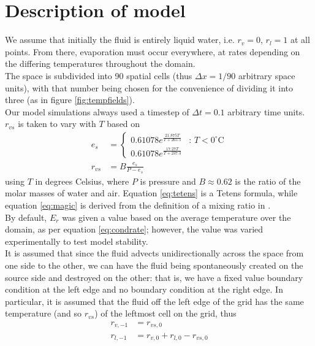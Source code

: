 \documentclass[11pt]{article}
\begin{document}
\section{Description of model}
We assume that initially the fluid is entirely liquid water, i.e. $r_v = 0$, $r_l = 1$ at all points. From there, evaporation must occur everywhere, at rates depending on the differing temperatures throughout the domain. \\
The space is subdivided into 90 spatial cells (thus $\Delta x=1/90$ arbitrary space units), with that number being chosen for the convenience of dividing it into three (as in figure \ref{fig:tempfields}). \\
Our model simulations always used a timestep of $\Delta t=0.1$ arbitrary time units. \\
$r_{vs}$ is taken to vary with $T$ based on
\begin{align}
e_s &= \begin{cases}
0.61078 e^{\frac{21.875T}{T+265.5}} & \text{: $T<0^{\circ}$C} \\
0.61078 e^{\frac{17.27T}{T+237.3}} &
\end{cases} \label{eq:tetens} \\
r_{vs} &= B\frac{e_s}{P-e_s} \label{eq:magic}
\end{align}
using $T$ in degrees Celsius, where $P$ is pressure and $B\approx0.62$ is the ratio of the molar masses of water and air. Equation \ref{eq:tetens} is a Tetens formula, while equation \ref{eq:magic} is derived from the definition of a mixing ratio in \citet[p.~100]{Ambaum2010}. \\
By default, $E_r$ was given a value based on the average temperature over the domain, as per equation \ref{eq:condrate}; however, the value was varied experimentally to test model stability. \\
It is assumed that since the fluid advects unidirectionally across the space from one side to the other, we can have the fluid being spontaneously created on the source side and destroyed on the other: that is, we have a fixed value boundary condition at the left edge and no boundary condition at the right edge. In particular, it is assumed that the fluid off the left edge of the grid has the same temperature (and so $r_{vs}$) of the leftmost cell on the grid, thus
\begin{align}
r_{v,-1} &= r_{vs,0} \label{eq:a} \\
r_{l,-1} &= r_{v,0}+r_{l,0}-r_{vs,0} \label{eq:b}
\end{align}
\end{document}
